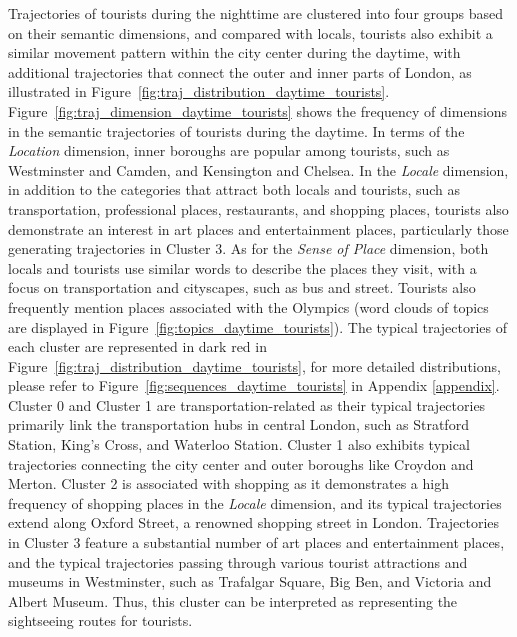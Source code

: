 \documentclass{article}
\theoremstyle{definition}
\theoremstyle{remark}
\begin{document}
Trajectories of tourists during the nighttime are clustered into four groups based on their semantic dimensions, and compared with locals, tourists also exhibit a similar movement pattern within the city center during the daytime, with additional trajectories that connect the outer and inner parts of London, as illustrated in Figure~\ref{fig:traj_distribution_daytime_tourists}. Figure~\ref{fig:traj_dimension_daytime_tourists} shows the frequency of dimensions in the semantic trajectories of tourists during the daytime. In terms of the \textit{Location} dimension, inner boroughs are popular among tourists, such as Westminster and Camden, and Kensington and Chelsea. In the \textit{Locale} dimension, in addition to the categories that attract both locals and tourists, such as transportation, professional places, restaurants, and shopping places, tourists also demonstrate an interest in art places and entertainment places, particularly those generating trajectories in Cluster 3. As for the \textit{Sense of Place} dimension, both locals and tourists use similar words to describe the places they visit, with a focus on transportation and cityscapes, such as bus and street. Tourists also frequently mention places associated with the Olympics (word clouds of topics are displayed in Figure~\ref{fig:topics_daytime_tourists}). The typical trajectories of each cluster are represented in dark red in Figure~\ref{fig:traj_distribution_daytime_tourists}, for more detailed distributions, please refer to Figure~\ref{fig:sequences_daytime_tourists} in Appendix \ref{appendix}. Cluster 0 and Cluster 1 are transportation-related as their typical trajectories primarily link the transportation hubs in central London, such as Stratford Station, King's Cross, and Waterloo Station. Cluster 1 also exhibits typical trajectories connecting the city center and outer boroughs like Croydon and Merton. Cluster 2 is associated with shopping as it demonstrates a high frequency of shopping places in the \textit{Locale} dimension, and its typical trajectories extend along Oxford Street, a renowned shopping street in London. Trajectories in Cluster 3 feature a substantial number of art places and entertainment places, and the typical trajectories passing through various tourist attractions and museums in Westminster, such as Trafalgar Square, Big Ben, and Victoria and Albert Museum. Thus, this cluster can be interpreted as representing the sightseeing routes for tourists.
\end{document}
